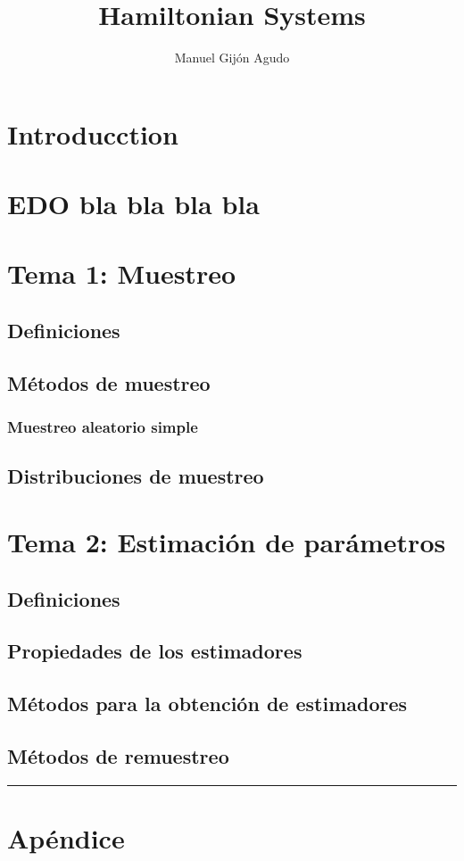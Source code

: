 \documentclass{article}
\title{Hamiltonian Systems}
\author{Manuel Gijón Agudo }
\date{}
\begin{document}
	\begin{titlepage}
		\maketitle{} 
	\end{titlepage}
	
	\newpage
	\tableofcontents
	\newpage
	
\section{Introducction}
\newpage	
\section{EDO bla bla bla bla}


		


		
\newpage
\section{Tema 1: Muestreo}
	\subsection{Definiciones}
	\subsection{Métodos de muestreo}
		\subsubsection{Muestreo aleatorio simple}
	\subsection{Distribuciones de muestreo}
	

\newpage
\section{Tema 2: Estimación de parámetros}
		\subsection{Definiciones}
		

		\subsection{Propiedades de los estimadores}
		\subsection{Métodos para la obtención de estimadores}
		\subsection{Métodos de remuestreo}
		


{\color{gray} \rule{\linewidth}{0.5mm} }

\section*{Apéndice}
  	
\end{document}
